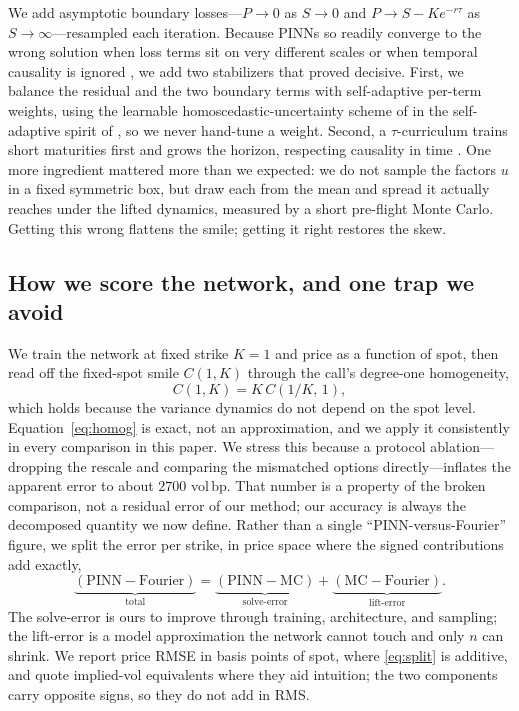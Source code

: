 \documentclass[11pt]{article}
\newcommand{\bp}{\ensuremath{\,\mathrm{bp}}}
\begin{document}
We add asymptotic boundary losses---$P\to0$ as $S\to0$ and
$P\to S-Ke^{-r\tau}$ as $S\to\infty$---resampled each iteration. Because PINNs so
readily converge to the wrong solution when loss terms sit on very different
scales or when temporal causality is ignored
\citep{krishnapriyan2021characterizing,wang2022when}, we add two stabilizers that
proved decisive. First, we balance the residual and the two boundary terms with
self-adaptive per-term weights, using the learnable homoscedastic-uncertainty
scheme of \citet{kendall2018multitask} in the self-adaptive spirit of
\citet{mcclenny2023self}, so we never hand-tune a weight. Second, a
$\tau$-curriculum trains short maturities first and grows the horizon, respecting
causality in time \citep{wang2024respecting}. One more ingredient mattered more
than we expected: we do not sample the factors $u$ in a fixed symmetric box, but
draw each from the mean and spread it actually reaches under the lifted dynamics,
measured by a short pre-flight Monte Carlo. Getting this wrong flattens the
smile; getting it right restores the skew.

\subsection{How we score the network, and one trap we avoid}
\label{sec:decomp}
We train the network at fixed strike $K=1$ and price as a function of spot, then
read off the fixed-spot smile $C(1,K)$ through the call's degree-one homogeneity,
\begin{equation}
C(1,K)=K\,C\!\left(1/K,\,1\right),
\label{eq:homog}
\end{equation}
which holds because the variance dynamics do not depend on the spot level.
Equation~\eqref{eq:homog} is exact, not an approximation, and we apply it
consistently in every comparison in this paper. We stress this because a protocol
ablation---dropping the rescale and comparing the mismatched options
directly---inflates the apparent error to about $2700$ vol\bp. That number is a
property of the broken comparison, not a residual error of our method; our
accuracy is always the decomposed quantity we now define. Rather than a single
``PINN-versus-Fourier'' figure, we split the error per strike, in price space
where the signed contributions add exactly,
\begin{equation}
\underbrace{(\mathrm{PINN}-\mathrm{Fourier})}_{\text{total}}
=\underbrace{(\mathrm{PINN}-\mathrm{MC})}_{\text{solve-error}}
+\underbrace{(\mathrm{MC}-\mathrm{Fourier})}_{\text{lift-error}} .
\label{eq:split}
\end{equation}
The solve-error is ours to improve through training, architecture, and sampling;
the lift-error is a model approximation the network cannot touch and only $n$ can
shrink. We report price RMSE in basis points of spot, where \eqref{eq:split} is
additive, and quote implied-vol equivalents where they aid intuition; the two
components carry opposite signs, so they do not add in RMS.
\end{document}
